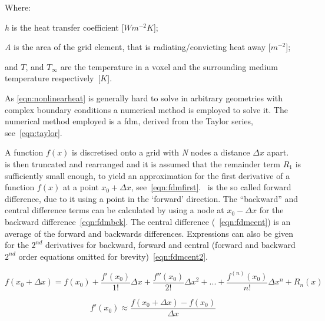 
\noindent Where:

	\indent \textit{h} is the heat transfer coefficient [$W m^{-2} K$];
	
	\indent \textit{A} is the area of the grid element, that is radiating/convicting heat away [$m^{-2}$];
	
	\indent and $T$, and $T_\infty$ are the temperature in a voxel and the surrounding medium temperature respectively~[$K$].
	
	\medskip

As \cref{eqn:nonlinearheat} is generally hard to solve in arbitrary geometries with complex boundary conditions a numerical method is employed to solve it.
The numerical method employed is a \gls*{fdm}, derived from the Taylor series, see~\cref{eqn:taylor}. 


A function $f(x)$ is discretised onto a grid with \textit{N} nodes a distance $\Delta x$ apart. ~ is then truncated and rearranged and it is assumed that the remainder term $R_1$ is sufficiently small enough, to yield an approximation for the first derivative of a function $f(x)$ at a point $x_0+\Delta x$, see~\cref{eqn:fdmfirst}.~ is the so called forward difference, due to it using a point in the `forward' direction. The ``backward'' and central difference terms can be calculated by using a node at $x_0-\Delta x$ for the backward difference~\cref{eqn:fdmbck}. The central difference (~\cref{eqn:fdmcent}) is an average of the forward and backwards differences. Expressions can also be given for the $2^{nd}$ derivatives for backward, forward and central (forward and backward $2^{nd}$ order equations omitted for brevity)~\cref{eqn:fdmcent2}.

\begin{equation}
f(x_0+\Delta x)=f(x_0) + \frac{f'(x_0)}{1!}\Delta x + \frac{f''(x_0)}{2!}\Delta x^2+...+ \frac{f^{(n)}(x_0)}{n!}\Delta x^n+R_n(x)
\label{eqn:taylor}
\end{equation}

\begin{equation}
f'(x_0) \approx \frac{f(x_0+\Delta x)-f(x_0)}{\Delta x}
\label{eqn:fdmfirst}
\end{equation}


